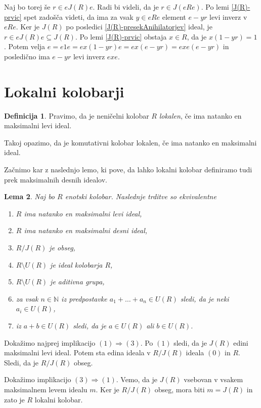 \documentclass[a4paper, 12pt]{amsart}
\theoremstyle{definition} %
\newtheorem{definicija}{Definicija}[section]
\theoremstyle{plain} %
\newtheorem{lema}[definicija]{Lema}
\newcommand{\N}{\mathbb N}
\begin{document}
Naj bo torej še $r\in eJ(R)e$. Radi bi videli, da je $r\in J(eRe)$. Po lemi \ref{J(R)-prvic} spet zadošča videti, da ima za vsak  $y\in eRe$ element $e-yr$ levi inverz v $eRe$. Ker je $J(R)$ po posledici \ref{J(R)-presekAnihilatorjev} ideal, je $r\in eJ(R)e \subseteq J(R)$. Po lemi \ref{J(R)-prvic} obstaja $x\in R$, da je $x(1-yr) = 1$. Potem velja $e = e1 e = ex(1-yr)e = ex(e-yr)= exe(e-yr)$ in posledično ima $e-yr$ levi inverz $exe$.
\endproof

\section{Lokalni kolobarji}

\begin{definicija}
Pravimo, da je neničelni kolobar $R$ \emph{lokalen}, če ima natanko en maksimalni levi ideal.
\end{definicija}
Takoj opazimo, da je komutativni kolobar lokalen, če ima natanko en maksimalni ideal.

Začnimo kar z naslednjo lemo, ki pove, da lahko lokalni kolobar definiramo tudi prek maksimalnih desnih idealov.

\begin{lema}
Naj bo $R$ enotski kolobar. Naslednje trditve so ekvivalentne
\label{classLocal}
\begin{enumerate}
\item $R$ ima natanko en maksimalni levi ideal,
\item $R$ ima natanko en maksimalni desni ideal,
\item $R/J(R)$ je obseg,
\item $R\setminus U(R)$ je ideal kolobarja $R$,
\item $R\setminus U(R)$ je aditivna grupa,
\item za vsak $n\in \N$ iz predpostavke $a_1 + \dots + a_n \in U(R)$ sledi, da je neki $a_i \in U(R)$,
\item iz $a+b\in U(R)$ sledi, da je $a\in U(R)$ ali $b\in U(R)$.
\end{enumerate}
\end{lema}

\proof
Dokažimo najprej implikacijo $(1) \Rightarrow (3)$. Po $(1)$ sledi, da je $J(R)$ edini maksimalni levi ideal. Potem sta edina ideala v $R/J(R)$ ideala $(0)$ in $R$. Sledi, da je $R/J(R)$ obseg.

Dokažimo implikacijo $(3) \Rightarrow (1)$. Vemo, da je $J(R)$ vsebovan v vsakem maksimalnem levem idealu $m$. Ker je $R/J(R)$ obseg, mora biti $m=J(R)$ in zato je $R$ lokalni kolobar.
\end{document}
